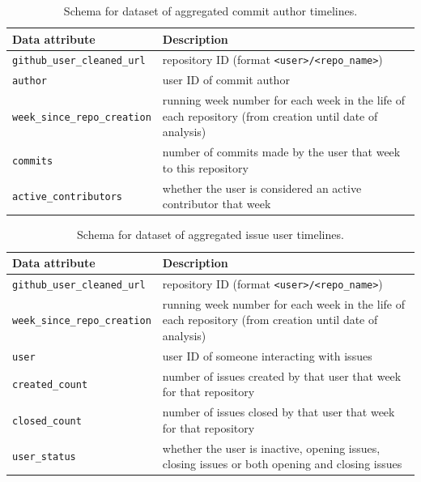 \documentclass[10pt,a4paper]{scrartcl}
\begin{document}
\begin{table}
    \centering
    \begin{tabular}{|l|l|}
        \hline
        Data attribute & Description \\
        \hline
        \verb|github_user_cleaned_url| & repository ID (format \verb|<user>/<repo_name>|) \\
        \verb|author| & user ID of commit author \\
        \verb|week_since_repo_creation| & running week number for each week in the life of each repository (from creation until date of analysis) \\
        \verb|commits| & number of commits made by the user that week to this repository \\
        \verb|active_contributors| & whether the user is considered an active contributor that week \\
        \hline
    \end{tabular}
    \caption{Schema for dataset of aggregated commit author timelines.}
    \label{table:schema_agg_commit_author}
\end{table}

\begin{table}
    \centering
    \begin{tabular}{|l|l|}
        \hline
        Data attribute & Description \\
        \hline
        \verb|github_user_cleaned_url| & repository ID (format \verb|<user>/<repo_name>|) \\
        \verb|week_since_repo_creation| & running week number for each week in the life of each repository (from creation until date of analysis) \\
        \verb|user| & user ID of someone interacting with issues \\
        \verb|created_count| & number of issues created by that user that week for that repository \\
        \verb|closed_count| & number of issues closed by that user that week for that repository \\
        \verb|user_status| & whether the user is inactive, opening issues, closing issues or both opening and closing issues \\
        \hline
    \end{tabular}
    \caption{Schema for dataset of aggregated issue user timelines.}
    \label{table:schema_agg_issue_users}
\end{table}
\end{document}
